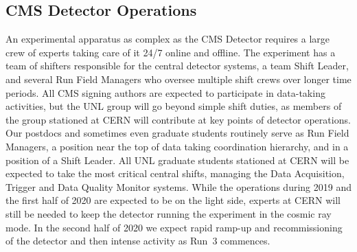 \subsection{CMS Detector Operations}
An experimental apparatus as complex as the CMS Detector requires a large crew of experts taking care of it 24/7 online and offline. The experiment has a team of shifters responsible for the central detector systems, a team Shift Leader, and several Run Field Managers who oversee multiple shift crews over longer time periods. 
All CMS signing authors are expected to participate in data-taking activities, but the UNL group will go beyond simple shift duties, as members of the group stationed at CERN will contribute at key points of detector operations.  Our postdocs and sometimes even graduate students routinely serve as Run Field Managers, a position near the top of data taking coordination hierarchy, and in a position of a Shift Leader.
All UNL graduate students stationed at CERN will be expected to take the most critical central shifts, managing the Data Acquisition, Trigger and Data Quality Monitor systems. While the operations during 2019 and the first half of 2020 are expected to be on the light side, experts at CERN will still be needed to keep the detector running the experiment in the cosmic ray mode. In the second half of 2020 we expect rapid ramp-up and recommissioning of the detector and then intense activity as Run~3 commences. 
